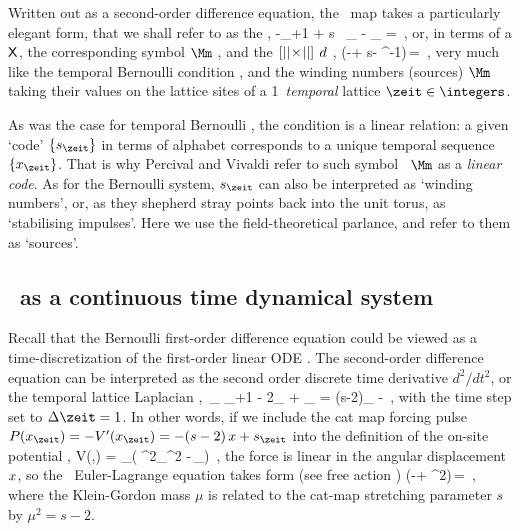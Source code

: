Written out as a second-order difference equation, the \PV\ map
 takes a particularly elegant form, that we shall
refer to as the {\em \templatt} ,
\beq
-\ssp_{\zeit+1}  +  s \, \ssp_{\zeit} - \ssp_{}
    =
\Ssym{\zeit}
\,,
or,
in terms of a {{\lattstate}} $\mathsf{X}$, the corresponding {symbol \brick}
$\Mm$ , and the $[{||}\!\times\!{||}]$ {\shiftOp}
$d$ ,
\beq
(-\shift + s\id - \shift^{-1})\,\Xx =  \Mm
\,,
very much like the {temporal Bernoulli} condition , and
the winding numbers (sources) $\Mm$ taking their values on the lattice
sites of a 1\dmn\ \emph{temporal} lattice $\zeit\in\integers$.

As was the case for {temporal Bernoulli} , the condition
 is a linear relation: a given `code'
$\{\Ssym{\zeit}\}$ in terms of alphabet  corresponds
to a unique temporal sequence $\{\ssp_\zeit\}$. That is why Percival and
Vivaldi refer to such symbol \brick\ $\Mm$ as a {\em linear
code}. As for the Bernoulli system, $\Ssym{\zeit}$ can also be
interpreted as `winding numbers', or, as they shepherd
stray points back into the unit torus, as `stabilising
impulses'. Here we use the field-theoretical parlance,
and refer to them  as `sources'.

                               \toCB

\subsection{\tempLatt\ as a continuous time dynamical system}
\label{s:tempCatODE}

Recall that the Bernoulli first-order difference equation could be viewed as
a time-discretization of the first-order linear ODE . The
second-order difference equation  can be interpreted as the
second order discrete time derivative ${d^2}/{dt^2}$, or the temporal
lattice Laplacian ,
\beq
\Box\,\ssp_\zeit \equiv
\ssp_{\zeit+1} - 2\ssp_{\zeit} + \ssp_{}
= (s-2)\ssp_{\zeit} -\Ssym{\zeit}
\,,
 with the time step set to $\Delta\zeit=1$.
In other words, if we include the cat map forcing pulse
\(
P(\ssp_\zeit)= - V'(\ssp_\zeit) = - (s-2)\,\ssp + \Ssym{\zeit}
\)
into the definition of
the on-site potential ,
\beq
V(\Xx,\Mm) = \sum_{\zeit\in\lattice}\left(
\mu^2\ssp_\zeit^2 -\Ssym{\zeit}\,\ssp_\zeit\right)
\,,
the force
is linear in the angular displacement $x$, so
the \templatt\ Euler-Lagrange equation takes form (see free action
)
\beq
(-\Box + {\mu}^2\id)\,\Xx = \Mm
\,,
where the Klein-Gordon mass ${\mu}$ is related to the cat-map
stretching parameter ${s}$ by ${\mu}^2={s}-2$.

